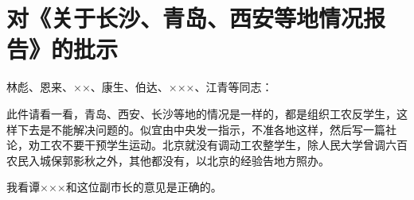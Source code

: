 \section[对《关于长沙、青岛、西安等地情况报告》的批示（一九六六年九月七日）]{对《关于长沙、青岛、西安等地情况报告》的批示}


\noindent 林彪、恩来、××、康生、伯达、×××、江青等同志：

此件请看一看，青岛、西安、长沙等地的情况是一样的，都是组织工农反学生，这样下去是不能解决问题的。似宜由中央发一指示，不准各地这样，然后写一篇社论，劝工农不要干预学生运动。北京就没有调动工农整学生，除人民大学曾调六百农民入城保郭影秋之外，其他都没有，以北京的经验告地方照办。

我看谭×××和这位副市长的意见是正确的。



